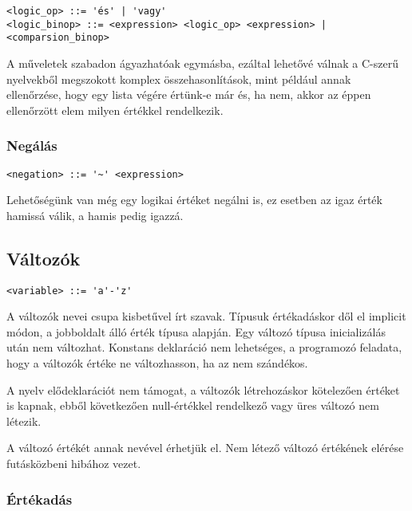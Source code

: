 \begin{footnotesize}
\begin{verbatim}
<logic_op> ::= 'és' | 'vagy'
<logic_binop> ::= <expression> <logic_op> <expression> | <comparsion_binop>
\end{verbatim}
\end{footnotesize}


A műveletek szabadon ágyazhatóak egymásba, ezáltal lehetővé válnak a C-szerű nyelvekből megszokott komplex összehasonlítások, mint például annak ellenőrzése, hogy egy lista végére értünk-e már és, ha nem, akkor az éppen ellenőrzött elem milyen értékkel rendelkezik.

\subsubsection{Negálás}

\begin{footnotesize}
\begin{verbatim}
<negation> ::= '~' <expression>
\end{verbatim}
\end{footnotesize}

Lehetőségünk van még egy logikai értéket negálni is, ez esetben az igaz érték hamissá válik, a hamis pedig igazzá.

\subsection{Változók}

\begin{footnotesize}
\begin{verbatim}
<variable> ::= 'a'-'z'
\end{verbatim}
\end{footnotesize}

A változók nevei csupa kisbetűvel írt szavak. Típusuk értékadáskor dől el implicit módon, a jobboldalt álló érték típusa alapján. Egy változó típusa inicializálás után nem változhat. Konstans deklaráció nem lehetséges, a programozó feladata, hogy a változók értéke ne változhasson, ha az nem szándékos.

A nyelv elődeklarációt nem támogat, a változók létrehozáskor kötelezően értéket is kapnak, ebből következően null-értékkel rendelkező vagy üres változó nem létezik.

A változó értékét annak nevével érhetjük el. Nem létező változó értékének elérése futásközbeni hibához vezet.

\subsubsection{Értékadás}

